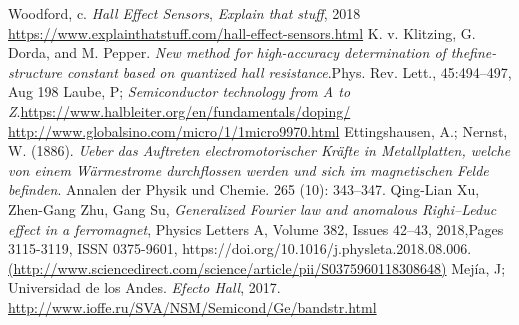 \documentclass[%
 reprint,
 amsmath,amssymb,
 aps,
]{revtex4-1}
\begin{document}
\begin{thebibliography}{9}

Woodford, c. \textit{Hall Effect Sensors}, \textit{Explain that stuff}, 2018 \url{https://www.explainthatstuff.com/hall-effect-sensors.html}
 K. v. Klitzing, G. Dorda, and M. Pepper. \textit{New method for high-accuracy determination of thefine-structure constant based on quantized hall resistance}.Phys. Rev. Lett., 45:494–497, Aug 198
Laube, P; \textit{Semiconductor technology from A to Z}.\url{https://www.halbleiter.org/en/fundamentals/doping/}
\url{http://www.globalsino.com/micro/1/1micro9970.html}
 Ettingshausen, A.; Nernst, W. (1886). \textit{Ueber das Auftreten electromotorischer Kräfte in Metallplatten, welche von einem Wärmestrome durchflossen werden und sich im magnetischen Felde befinden}. Annalen der Physik und Chemie. 265 (10): 343–347.
 Qing-Lian Xu, Zhen-Gang Zhu, Gang Su, \textit{Generalized Fourier law and anomalous Righi–Leduc effect in a ferromagnet}, Physics Letters A, Volume 382, Issues 42–43, 2018,Pages 3115-3119, ISSN 0375-9601, https://doi.org/10.1016/j.physleta.2018.08.006. \url{(http://www.sciencedirect.com/science/article/pii/S0375960118308648)}
 Mejía, J; Universidad de los Andes. \textit{Efecto Hall}, 2017.
\url{http://www.ioffe.ru/SVA/NSM/Semicond/Ge/bandstr.html}
\end{thebibliography}
\end{document}
